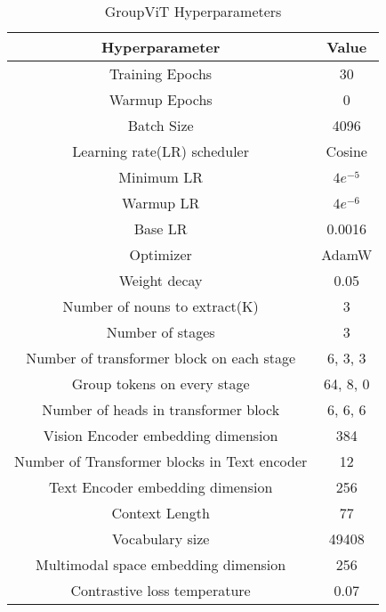 
%
\begin{table}[htbp]
\label{tab:hp}
  \centering
  \begin{tabular}{c|c}
    \toprule
    \textbf{Hyperparameter} & \textbf{Value} \\
    \midrule
    Training Epochs & 30 \\
    \midrule
    Warmup Epochs & 0\\
    \midrule
    Batch Size & 4096 \\
    \midrule
    Learning rate(LR) scheduler &  Cosine\\
    \midrule
    Minimum LR & $4e^{-5}$ \\
    \midrule
    Warmup LR & $4e^{-6}$ \\
    \midrule
    Base LR & 0.0016\\
    \midrule
    Optimizer &  AdamW\\
    \midrule
    Weight decay & 0.05 \\
    \midrule
    Number of nouns to extract(K) & 3 \\
    \midrule
    Number of stages & 3 \\
    \midrule
    Number of transformer block on each stage & 6, 3, 3 \\
    \midrule
    Group tokens on every stage & 64, 8, 0\\
    \midrule
    Number of heads in transformer block & 6, 6, 6\\
    \midrule
    Vision Encoder embedding dimension & 384\\
    \midrule
    Number of Transformer blocks in Text encoder & 12\\
    \midrule
    Text Encoder embedding dimension & 256\\
    \midrule
    Context Length  & 77\\
    \midrule
    Vocabulary size  & 49408\\
    \midrule
    Multimodal space embedding dimension & 256\\
    \midrule
    Contrastive loss temperature  & 0.07\\
    \bottomrule
    
  \end{tabular}
  
  \caption{GroupViT  Hyperparameters}
\end{table}


%